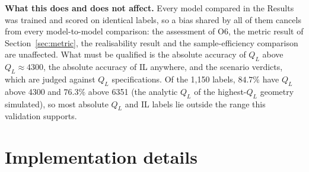 \documentclass[11pt]{article}
\newcommand{\QL}{Q_L}
\begin{document}
\textbf{What this does and does not affect.} Every model compared in
the Results was trained and scored on identical labels, so a bias shared by all
of them cancels from every model-to-model comparison: the assessment of O6,
the metric result of Section~\ref{sec:metric}, the realisability result and
the sample-efficiency comparison are unaffected. What must be qualified is the
absolute accuracy of $\QL$ above $\QL \approx 4300$, the absolute accuracy of
IL anywhere, and the scenario verdicts, which are judged against $\QL$ specifications. Of the 1{,}150 labels, $84.7\%$ have $\QL$ above 4300 and $76.3\%$ above 6351 (the analytic $\QL$ of the highest-$\QL$ geometry simulated), so most absolute $\QL$ and IL labels lie outside the range this validation supports.


\section{Implementation details}
\label{sec:appimpl}
\end{document}
